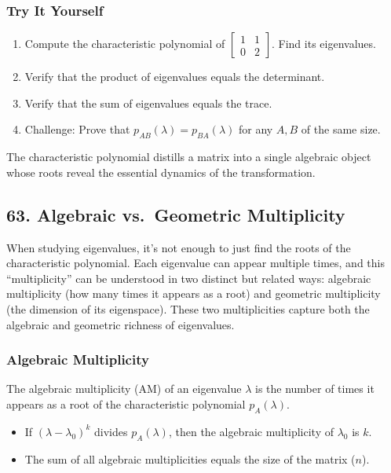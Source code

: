 \documentclass[
  letterpaper,
  DIV=11,
  numbers=noendperiod]{scrreprt}
\providecommand{\tightlist}{%
  \setlength{\itemsep}{0pt}\setlength{\parskip}{0pt}}
\begin{document}
\subsubsection{Try It Yourself}\label{try-it-yourself-61}

\begin{enumerate}
\def\labelenumi{\arabic{enumi}.}
\tightlist
\item
  Compute the characteristic polynomial of
  \(\begin{bmatrix} 1 & 1 \\ 0 & 2 \end{bmatrix}\). Find its
  eigenvalues.
\item
  Verify that the product of eigenvalues equals the determinant.
\item
  Verify that the sum of eigenvalues equals the trace.
\item
  Challenge: Prove that \(p_{AB}(\lambda) = p_{BA}(\lambda)\) for any
  \(A, B\) of the same size.
\end{enumerate}

The characteristic polynomial distills a matrix into a single algebraic
object whose roots reveal the essential dynamics of the transformation.

\subsection{63. Algebraic vs.~Geometric
Multiplicity}\label{algebraic-vs.-geometric-multiplicity}

When studying eigenvalues, it's not enough to just find the roots of the
characteristic polynomial. Each eigenvalue can appear multiple times,
and this ``multiplicity'' can be understood in two distinct but related
ways: algebraic multiplicity (how many times it appears as a root) and
geometric multiplicity (the dimension of its eigenspace). These two
multiplicities capture both the algebraic and geometric richness of
eigenvalues.

\subsubsection{Algebraic Multiplicity}\label{algebraic-multiplicity}

The algebraic multiplicity (AM) of an eigenvalue \(\lambda\) is the
number of times it appears as a root of the characteristic polynomial
\(p_A(\lambda)\).

\begin{itemize}
\tightlist
\item
  If \((\lambda - \lambda_0)^k\) divides \(p_A(\lambda)\), then the
  algebraic multiplicity of \(\lambda_0\) is \(k\).
\item
  The sum of all algebraic multiplicities equals the size of the matrix
  (\(n\)).
\end{itemize}
\end{document}
